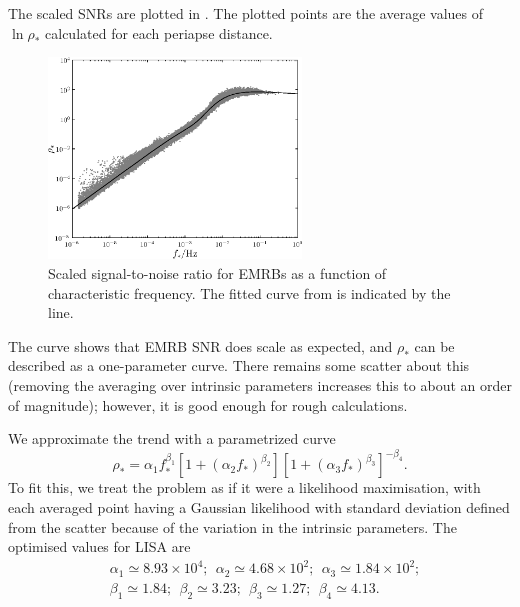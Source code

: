 The scaled SNRs are plotted in . The plotted points are the average values of $\ln \rho_\ast$ calculated for each periapse distance.
\begin{figure}[!htp]
\begin{center}
 \includegraphics[width=0.6\textwidth]{./images/Fig_SNR_scaled_fit}
 \caption{Scaled signal-to-noise ratio for EMRBs as a function of characteristic frequency. The fitted curve from  is indicated by the line.\label{fig:scaled-SNR}}%
   \end{center}
\end{figure}
The curve shows that EMRB SNR does scale as expected, and $\rho_\ast$ can be described as a one-parameter curve. There remains some scatter about this (removing the averaging over intrinsic parameters increases this to about an order of magnitude); however, it is good enough for rough calculations.

We approximate the trend with a parametrized curve
\begin{equation}
\rho_\ast = \alpha_1 f_\ast^{\beta_1} \left[1 + \left(\alpha_2 f_\ast\right)^{\beta_2}\right]\left[1 + \left(\alpha_3 f_\ast\right)^{\beta_3}\right]^{-\beta_4}.
\label{eq:scaled-SNR}
\end{equation}
To fit this, we treat the problem as if it were a likelihood maximisation, with each averaged point having a Gaussian likelihood with standard deviation defined from the scatter because of the variation in the intrinsic parameters. The optimised values for LISA are
\begin{equation}
\begin{split}
&\alpha_1 \simeq 8.93 \times 10^4; \ \  \alpha_2 \simeq 4.68 \times 10^2; \ \  \alpha_3 \simeq 1.84 \times 10^2;\\
&\beta_1 \simeq 1.84; \ \  \beta_2 \simeq 3.23; \ \  \beta_3 \simeq 1.27; \ \  \beta_4 \simeq 4.13.
\end{split}
\end{equation}

